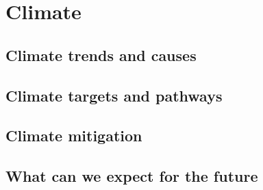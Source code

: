 \documentclass[../summary.tex]{subfiles}
\begin{document}
	
	\section{Climate}
		
		\subsection{Climate trends and causes}
			
		\subsection{Climate targets and pathways}
		
		\subsection{Climate mitigation}
		
		\subsection{What can we expect for the future}
	
\end{document}
